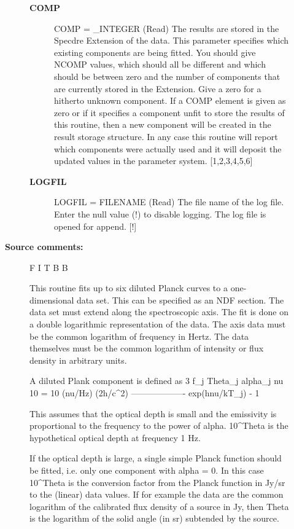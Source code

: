 \begin{description}
\begin{description}
\begin{description}
\item [\textbf{COMP}]
COMP = \_INTEGER (Read)
   The results are stored in the Specdre Extension of the data.
   This parameter specifies which existing components are being
   fitted. You should give NCOMP values, which should all be
   different and which should be between zero and the number of
   components that are currently stored in the Extension. Give a
   zero for a hitherto unknown component. If a COMP element is
   given as zero or if it specifies a component unfit to store the
   results of this routine, then a new component will be created
   in the result storage structure. In any case this routine will
   report which components were actually used and it will deposit
   the updated values in the parameter system. [1,2,3,4,5,6]
\item [\textbf{LOGFIL}]
LOGFIL = FILENAME (Read)
   The file name of the log file. Enter the null value (!) to
   disable logging. The log file is opened for append. [!]

\end{description}

\item [\textbf{Source comments:}]
\begin{terminalv}
   F I T B B

   This routine fits up to six diluted Planck curves to a
   one-dimensional data set. This can be specified as an NDF section.
   The data set must extend along the spectroscopic axis. The fit is
   done on a double logarithmic representation of the data. The axis
   data must be the common logarithm of frequency in Hertz. The data
   themselves must be the common logarithm of intensity or flux
   density in arbitrary units.

   A diluted Plank component is defined as
                                                          3
        f_j     Theta_j        alpha_j                  nu
      10    = 10        (nu/Hz)        (2h/c^2)  -------------------
                                                   exp(hnu/kT_j) - 1

   This assumes that the optical depth is small and the emissivity is
   proportional to the frequency to the power of alpha. 10^Theta is
   the hypothetical optical depth at frequency 1 Hz.

   If the optical depth is large, a single simple Planck function
   should be fitted, i.e. only one component with alpha = 0. In this
   case 10^Theta is the conversion factor from the Planck function in
   Jy/sr to the (linear) data values. If for example the data are the
   common logarithm of the calibrated flux density of a source in Jy,
   then Theta is the logarithm of the solid angle (in sr) subtended
   by the source.


\end{terminalv}
\end{description}
\end{description}
